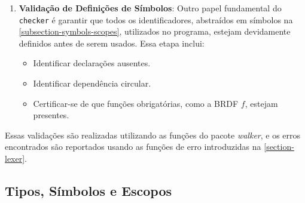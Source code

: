 \begin{enumerate}
    \item \textbf{Validação de Definições de Símbolos}:
        Outro papel fundamental do \texttt{checker} é garantir que todos os identificadores, abstraídos em símbolos na \autoref{subsection-symbols-scopes}, utilizados no programa, estejam devidamente definidos antes de serem usados. Essa etapa inclui:
    \begin{itemize}
        \item Identificar declarações ausentes.
        \item Identificar dependência circular.
        \item Certificar-se de que funções obrigatórias, como a BRDF $f$, estejam presentes.
    \end{itemize}
\end{enumerate}

Essas validações são realizadas utilizando as funções do pacote \textit{walker}, e os erros encontrados são reportados usando as funções de erro introduzidas na \autoref{section-lexer}.

%
%
%
%

\subsection{Tipos, Símbolos e Escopos} \label{subsection-symbols-scopes}

